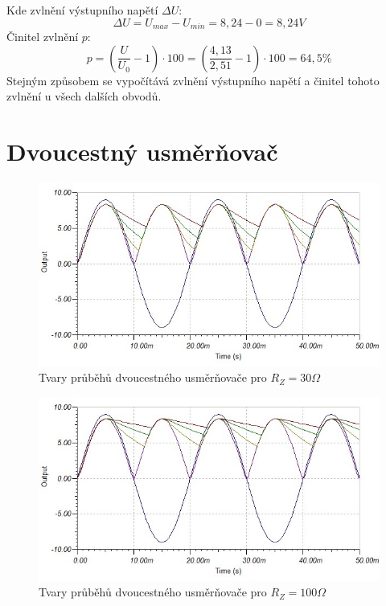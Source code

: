 \documentclass[12pt]{article} %
\begin{document}
Kde zvlnění výstupního napětí $\Delta U$:
\begin{equation}
\Delta U = U_{max} - U_{min} = 8,24 - 0 = 8,24 V
\end{equation}
Činitel zvlnění $p$:
\begin{equation}
p = \left( \frac{U}{U_0} -1 \right) \cdot 100 = \left( \frac{4,13}{2,51} -1 \right) \cdot 100 = 64,5\%
\end{equation}
Stejným způsobem se vypočítává zvlnění výstupního napětí a činitel tohoto zvlnění u všech dalších obvodů.

\section{Dvoucestný usměrňovač}
\begin{figure}[H]
\center
\includegraphics[scale=0.6]{dvoucestny30.jpg}
\caption{Tvary průběhů dvoucestného usměrňovače pro $R_Z = 30\Omega$}
\end{figure}

\begin{figure}[H]
\center
\includegraphics[scale=0.6]{dvoucestny100.jpg}
\caption{Tvary průběhů dvoucestného usměrňovače pro $R_Z = 100\Omega$}
\end{figure}
\end{document}
